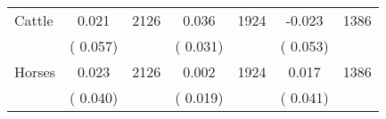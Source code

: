 \begin{tabular}{l*{6}{c}}
Cattle        &              0.021      &       2126       &              0.036      &       1924       &             -0.023      &       1386       \\
                       &       (       0.057)            &                               &       (       0.031)            &                               &       (       0.053)            &                               \\
Horses        &              0.023      &       2126       &              0.002      &       1924       &              0.017      &       1386       \\
                       &       (       0.040)            &                               &       (       0.019)            &                               &       (       0.041)            &                               \\
\hline \end{tabular}